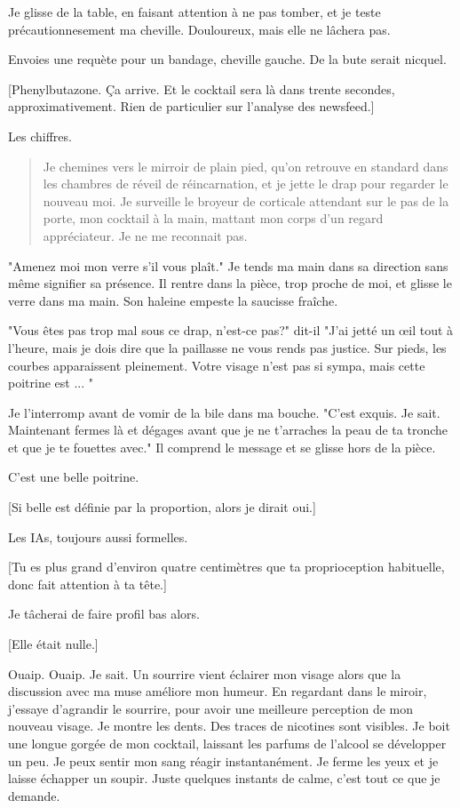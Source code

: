 Je glisse de la table, en faisant attention à ne pas tomber, et je teste précautionnesement ma cheville. Douloureux, mais elle ne lâchera pas. 

Envoies une requète pour un bandage, cheville gauche. De la bute serait nicquel. 

[Phenylbutazone. Ça arrive. Et le cocktail sera là dans trente secondes, approximativement. Rien de particulier sur l'analyse des newsfeed.] 

Les chiffres. 

\begin{quotation} Je chemines vers le mirroir de plain pied, qu'on retrouve en standard dans les chambres de réveil de réincarnation, et je jette le drap pour regarder le nouveau moi. Je surveille le broyeur de corticale attendant sur le pas de la porte, mon cocktail à la main, mattant mon corps d'un regard appréciateur. Je ne me reconnait pas. \end{quotation} 

"Amenez moi mon verre s'il vous plaît." Je tends ma main dans sa direction sans même signifier sa présence. Il rentre dans la pièce, trop proche de moi, et glisse le verre dans ma main. Son haleine empeste la saucisse fraîche. 

"Vous êtes pas trop mal sous ce drap, n'est-ce pas?" dit-il "J'ai jetté un œil tout à l'heure, mais je dois dire que la paillasse ne vous rends pas justice. Sur pieds, les courbes apparaissent pleinement. Votre visage n'est pas si sympa, mais cette poitrine est ... " 

Je l'interromp avant de vomir de la bile dans ma bouche. "C'est exquis. Je sait. Maintenant fermes là et dégages avant que je ne t'arraches la peau de ta tronche et que je te fouettes avec." Il comprend le message et se glisse hors de la pièce. 

C'est une belle poitrine. 

[Si belle est définie par la proportion, alors je dirait oui.] 

Les IAs, toujours aussi formelles. 

[Tu es plus grand d'environ quatre centimètres que ta proprioception habituelle, donc fait attention à ta tête.] 

Je tâcherai de faire profil bas alors. 

[Elle était nulle.] 

Ouaip. Ouaip. Je sait. Un sourrire vient éclairer mon visage alors que la discussion avec ma muse améliore mon humeur. En regardant dans le miroir, j'essaye d'agrandir le sourrire, pour avoir une meilleure perception de mon nouveau visage. Je montre les dents. Des traces de nicotines sont visibles. Je boit une longue gorgée de mon cocktail, laissant les parfums de l'alcool se développer un peu. Je peux sentir mon sang réagir instantanément. Je ferme les yeux et je laisse échapper un soupir. Juste quelques instants de calme, c'est tout ce que je demande. 

